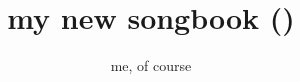 \title{my new songbook ()}
\author{me, of course}
\newcommand{\introduction}{
  introduction to the songbook
}

